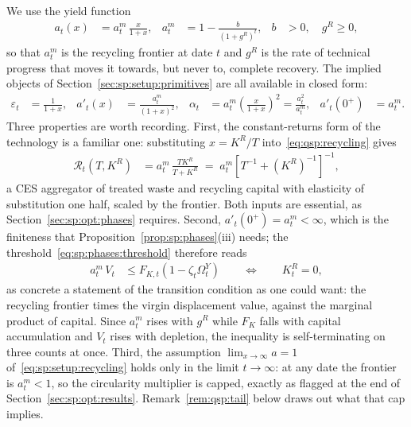  We use the yield function
\begin{align}
a_t\!\left(x\right) &= a^m_t\,\frac{x}{1+x},
&
a^m_t &= 1-\frac{b}{\left(1+g^R\right)^t},
&
b&>0,\quad g^R\ge0,
\label{eq:qsp:recycling}
\end{align}
so that $a^m_t$ is the recycling frontier at date $t$ and $g^R$ is the rate of technical progress that
moves it towards, but never to, complete recovery. The implied objects of
Section~\ref{sec:sp:setup:primitives} are all available in closed form:
\begin{align}
\varepsilon_t &= \frac{1}{1+x},
&
a'_t\!\left(x\right) &= \frac{a^m_t}{\left(1+x\right)^2},
&
\alpha_t &= a^m_t\left(\frac{x}{1+x}\right)^2 = \frac{a_t^2}{a^m_t},
&
a'_t\!\left(0^+\right) &= a^m_t .
\label{eq:qsp:recycling-derivatives}
\end{align}
Three properties are worth recording. First, the constant-returns form of the technology is a familiar
one: substituting $x=K^R/T$ into~\eqref{eq:qsp:recycling} gives
\begin{align}
\mathcal R_t\!\left(T,K^R\right) &= a^m_t\,\frac{TK^R}{T+K^R}
\;=\;a^m_t\left[T^{-1}+\left(K^R\right)^{-1}\right]^{-1},
\label{eq:qsp:recycling-crs}
\end{align}
a CES aggregator of treated waste and recycling capital with elasticity of substitution one half,
scaled by the frontier. Both inputs are essential, as Section~\ref{sec:sp:opt:phases} requires.
Second, $a'_t\!\left(0^+\right)=a^m_t<\infty$, which is the finiteness that
Proposition~\ref{prop:sp:phases}(iii) needs; the threshold~\eqref{eq:sp:phases:threshold} therefore
reads
\begin{align}
a^m_t\,V_t &\le F_{K,t}\left(1-\zeta_t\Omega^Y_t\right)
\qquad\Longleftrightarrow\qquad
K^R_t=0 ,
\label{eq:qsp:threshold}
\end{align}
as concrete a statement of the transition condition as one could want: the recycling frontier times the
virgin displacement value, against the marginal product of capital. Since $a^m_t$ rises with $g^R$
while $F_K$ falls with capital accumulation and $V_t$ rises with depletion, the inequality is
self-terminating on three counts at once. Third, the assumption $\lim_{x\to\infty}a=1$
of~\eqref{eq:sp:setup:recycling} holds only in the limit $t\to\infty$: at any date the frontier is
$a^m_t<1$, so the circularity multiplier is capped, exactly as flagged at the end of
Section~\ref{sec:sp:opt:results}. Remark~\ref{rem:qsp:tail} below draws out what that cap implies.

